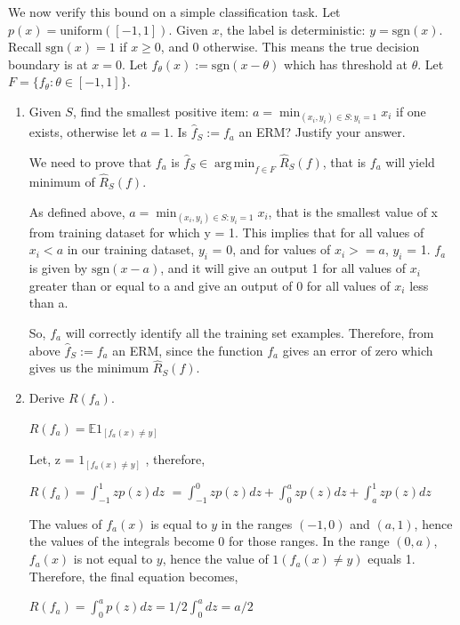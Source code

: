 \documentclass[a4paper]{article}
\theoremstyle{definition}
\DeclareMathOperator*{\argmin}{arg\,min}
\newcommand{\sgn}{\mathrm{sgn}}
\def\E{\mathbb E}
\newenvironment{soln}{
    \leavevmode\color{blue}\ignorespaces
}{}
\begin{document}
We now verify this bound on a simple classification task.  Let $p(x)=\mathrm{uniform}([-1,1])$.  Given $x$, the label is deterministic: $y=\sgn(x)$.
Recall $\sgn(x)=1$ if $x\ge 0$, and 0 otherwise.
This means the true decision boundary is at $x=0$.
Let $f_\theta(x) := \sgn(x-\theta)$ which has threshold at $\theta$.
Let $F=\{f_\theta: \theta \in [-1,1]\}$.  
\begin{enumerate}
\item Given $S$, find the smallest positive item: $a = \min_{(x_i, y_i)\in S: y_i=1} x_i$ if one exists, otherwise let $a=1$.  Is $\hat f_S := f_a$ an ERM?  Justify your answer.
\begin{soln}

We need to prove  that $f_a$ is $\hat f_S \in \argmin_{f\in F}\hat R_S(f)$, that is $f_a$ will yield minimum of  $\hat R_S(f)$. 
	
As defined above, $a = \min_{(x_i, y_i)\in S: y_i=1} x_i$, that is the smallest value of x from training dataset for which y = 1. This implies that for all values of $x_i < a$ in our training dataset, $y_i$ = 0, and for values of $x_i >= a$, $y_i$ = 1.
$f_a$ is given by $\sgn(x-a)$, and it will give an output 1 for all values of $x_i$ greater than or equal to a and give an output of 0 for all values of $x_i$ less than a.

So, $f_a$ will correctly identify all the training set examples. Therefore, from above $\hat f_S := f_a$ an ERM, since the function $f_a$ gives an error of zero which gives us the minimum $\hat R_S(f)$.

\end{soln}

\item Derive $R(f_a)$.
\begin{soln}

	$R(f_a) =  \E 1_{[f_a(x)\neq y]}$

	Let, z = $1_{[f_a(x)\neq y]}$ , therefore, 
	
	$R(f_a) = \int_{-1}^{1} z p(z)dz$
	$ = \int_{-1}^{0} z p(z)dz + \int_{0}^{a} z p(z)dz + \int_{a}^{1} z p(z)dz$

	The values of $f_a(x)$ is equal to $y$ in the ranges $(-1, 0)$ and $(a, 1)$, hence the values of the integrals become 0 for those ranges.
	In the range $(0, a)$, $f_a(x)$ is not equal to  $y$, hence the value of $1(f_a(x)\neq y)$ equals 1. Therefore, the final equation becomes,
	 
	$R(f_a)  = \int_{0}^{a} p(z)dz  = 1/2 \int_{0}^{a} dz = a/2$


\end{soln}
\end{enumerate}
\end{document}
